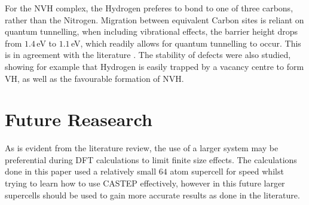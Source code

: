 \documentclass[10pt,a4paper,twocolumn,twoside]{extarticle}
\begin{document}
For the NVH complex, the Hydrogen preferes to bond to one of three carbons, rather than the Nitrogen. Migration between equivalent Carbon sites is reliant on quantum tunnelling, when including vibrational effects, the barrier height drops from $1.4$\,eV to $1.1$\,eV, which readily allows for quantum tunnelling to occur. This is in agreement with the literature \cite{Shaw_QT_VH}.
The stability of defects were also studied, showing for example that Hydrogen is easily trapped by a vacancy centre to form VH, as well as the favourable formation of NVH. 

\section{Future Reasearch}
As is evident from the literature review, the use of a larger system may be preferential during DFT calculations to limit finite size effects. The calculations done in this paper used a relatively small $64$ atom supercell for speed whilst trying to learn how to use CASTEP effectively, however in this future larger supercells should be used to gain more accurate results as done in the literature.

\printbibliography
\end{document}
